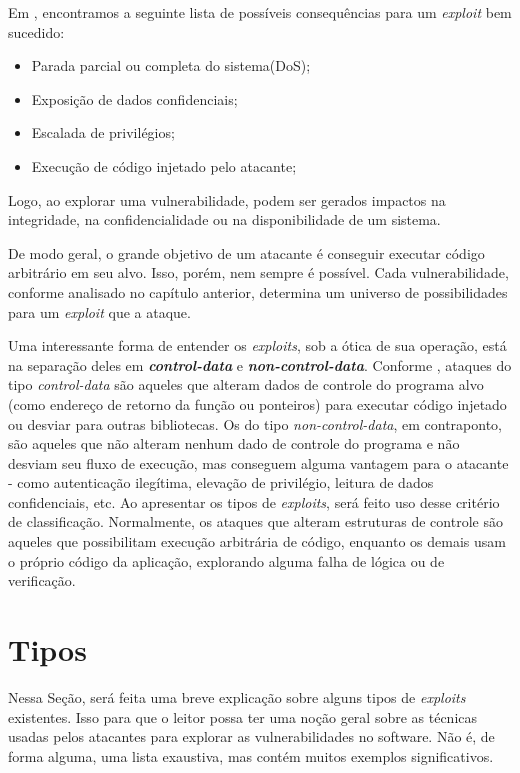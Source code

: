 		
		Em \cite{Hoglund2004}, encontramos a seguinte lista de possíveis consequências
		para um \textsl{exploit} bem sucedido:
		\begin{itemize}
			\item{Parada parcial ou completa do sistema(DoS);}
			\item{Exposição de dados confidenciais;}
			\item{Escalada de privilégios;}
			\item{Execução de código injetado pelo atacante;}
		\end{itemize}
		Logo, ao explorar uma vulnerabilidade, podem ser gerados impactos na integridade, na confidencialidade
		ou na disponibilidade de um sistema.


		De modo geral, o grande objetivo de um atacante é conseguir executar código arbitrário
		em seu alvo. Isso, porém, nem sempre é possível. Cada vulnerabilidade, conforme analisado
		no capítulo anterior, determina um universo de possibilidades para um \textsl{exploit} que a ataque.


		Uma interessante forma de entender os \textsl{exploits}, sob a ótica de sua operação,
		está na separação deles em \textsl{\textbf{control-data}} e \textsl{\textbf{non-control-data}}.
		Conforme \cite{Chen2005}, ataques do tipo \textsl{control-data} são aqueles que
		alteram dados de controle do programa alvo (como endereço de retorno da função ou ponteiros)
		para executar código injetado ou desviar para outras bibliotecas. Os do tipo
		\textsl{non-control-data}, em contraponto, são aqueles que não alteram nenhum
		dado de controle do programa e não desviam seu fluxo de execução, mas conseguem
		alguma vantagem para o atacante - como autenticação ilegítima, elevação de privilégio, 
		leitura de dados confidenciais, etc. Ao apresentar os tipos de \textsl{exploits},
		será feito uso desse critério de classificação. Normalmente, os ataques que alteram
		estruturas de controle são aqueles que possibilitam execução arbitrária de código, enquanto
		os demais usam o próprio código da aplicação, explorando alguma falha de lógica ou de
		verificação.
		

	\section{Tipos}
		Nessa Seção, será feita uma breve explicação sobre alguns tipos de \textsl{exploits}
		existentes. Isso para que o leitor possa ter uma noção geral sobre as técnicas usadas
		pelos atacantes para explorar as vulnerabilidades no software.
		Não é, de forma alguma, uma lista exaustiva, mas contém muitos exemplos significativos.
		
